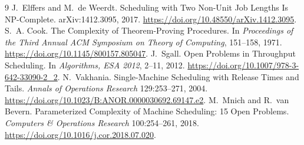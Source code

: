 \documentclass[11pt,a4paper]{article}
\theoremstyle{definition}
\begin{document}
\clearpage
\begin{thebibliography}{9}
J.~Elffers and M.~de Weerdt.
\newblock Scheduling with Two Non-Unit Job Lengths Is NP-Complete.
\newblock arXiv:1412.3095, 2017.
\newblock \url{https://doi.org/10.48550/arXiv.1412.3095}.
S.~A. Cook.
\newblock The Complexity of Theorem-Proving Procedures.
\newblock In \emph{Proceedings of the Third Annual ACM Symposium on Theory of
Computing}, 151--158, 1971.
\newblock \url{https://doi.org/10.1145/800157.805047}.
J.~Sgall.
\newblock Open Problems in Throughput Scheduling.
\newblock In \emph{Algorithms, ESA 2012}, 2--11, 2012.
\newblock \url{https://doi.org/10.1007/978-3-642-33090-2_2}.
N.~Vakhania.
\newblock Single-Machine Scheduling with Release Times and Tails.
\newblock \emph{Annals of Operations Research} 129:253--271, 2004.
\newblock \url{https://doi.org/10.1023/B:ANOR.0000030692.69147.e2}.
M.~Mnich and R.~van Bevern.
\newblock Parameterized Complexity of Machine Scheduling: 15 Open Problems.
\newblock \emph{Computers \& Operations Research} 100:254--261, 2018.
\newblock \url{https://doi.org/10.1016/j.cor.2018.07.020}.
\end{thebibliography}
\end{document}
